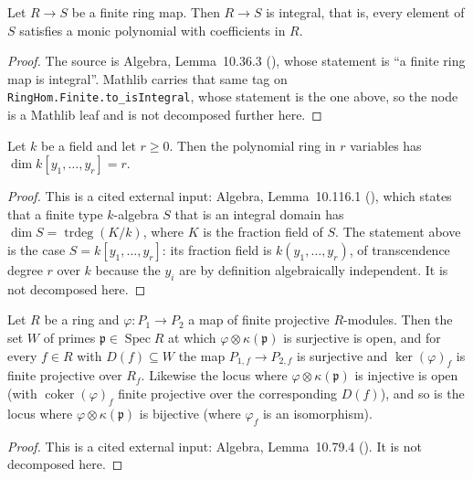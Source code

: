 \begin{lemma}
\label{lem:pcb-finite-is-integral}
Let \(R\to S\) be a finite ring map.  Then \(R\to S\) is integral,
that is, every element of \(S\) satisfies a monic polynomial with
coefficients in \(R\).
\mathlibok\ 
\end{lemma}
\begin{proof}
The source is Algebra, Lemma~10.36.3 (), whose
statement is ``a finite ring map is integral''.  Mathlib carries that
same tag on \texttt{RingHom.Finite.to\_isIntegral}, whose statement is
the one above, so the node is a Mathlib leaf and is not decomposed
further here.
\end{proof}

\begin{lemma}
\label{lem:pcb-polynomial-ring-dimension}
Let \(k\) be a field and let \(r\geq0\).  Then the polynomial ring in
\(r\) variables has \(\dim k[y_1,\dots,y_r]=r\).
\end{lemma}
\begin{proof}
This is a cited external input: Algebra, Lemma~10.116.1
(), which states that a finite type \(k\)-algebra
\(S\) that is an integral domain has \(\dim S=\operatorname{trdeg}(K/k)\),
where \(K\) is the fraction field of \(S\).  The statement above is the
case \(S=k[y_1,\dots,y_r]\): its fraction field is
\(k(y_1,\dots,y_r)\), of transcendence degree \(r\) over \(k\) because
the \(y_i\) are by definition algebraically independent.  It is not
decomposed here.
\end{proof}

\begin{lemma}
\label{lem:pcb-surjective-locus-open}
Let \(R\) be a ring and \(\varphi:P_1\to P_2\) a map of finite
projective \(R\)-modules.  Then the set \(W\) of primes
\(\mathfrak p\in\operatorname{Spec}R\) at which
\(\varphi\otimes\kappa(\mathfrak p)\) is surjective is open, and for
every \(f\in R\) with \(D(f)\subseteq W\) the map
\(P_{1,f}\to P_{2,f}\) is surjective and \(\ker(\varphi)_f\) is finite
projective over \(R_f\).  Likewise the locus where
\(\varphi\otimes\kappa(\mathfrak p)\) is injective is open (with
\(\operatorname{coker}(\varphi)_f\) finite projective over the
corresponding \(D(f)\)), and so is the locus where
\(\varphi\otimes\kappa(\mathfrak p)\) is bijective (where
\(\varphi_f\) is an isomorphism).
\end{lemma}
\begin{proof}
This is a cited external input: Algebra, Lemma~10.79.4
().  It is not decomposed here.
\end{proof}

